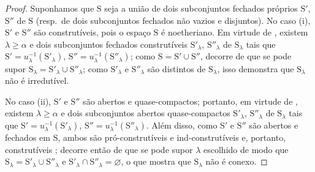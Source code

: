\begin{proof}
Suponhamos que $\mathrm{S}$ seja a união de dois subconjuntos fechados próprios $\mathrm{S}'$, $\mathrm{S}''$ de $\mathrm{S}$ (resp.\ de dois subconjuntos fechados não vazios e disjuntos).
No caso (i), $\mathrm{S}'$ e $\mathrm{S}''$ são construtíveis, pois o espaço $\mathrm{S}$ é noetheriano.
Em virtude de , existem $\lambda\geqslant\alpha$ e dois subconjuntos fechados construtíveis $\mathrm{S}'_\lambda$, $\mathrm{S}''_\lambda$ de $\mathrm{S}_\lambda$ tais que $\mathrm{S}'=u_\lambda^{-1}(\mathrm{S}'_\lambda)$, $\mathrm{S}''=u_\lambda^{-1}(\mathrm{S}''_\lambda)$; como $\mathrm{S}=\mathrm{S}'\cup\mathrm{S}''$, decorre de  que se pode supor $\mathrm{S}_\lambda=\mathrm{S}'_\lambda\cup\mathrm{S}''_\lambda$; como $\mathrm{S}'_\lambda$ e $\mathrm{S}''_\lambda$ são distintos de $\mathrm{S}_\lambda$, isso demonstra que $\mathrm{S}_\lambda$ não é irredutível.

No caso (ii), $\mathrm{S}'$ e $\mathrm{S}''$ são abertos e quase-compactos; portanto, em virtude de , existem $\lambda\geqslant\alpha$ e dois subconjuntos abertos quase-compactos $\mathrm{S}'_\lambda$, $\mathrm{S}''_\lambda$ de $\mathrm{S}_\lambda$ tais que $\mathrm{S}'=u_\lambda^{-1}(\mathrm{S}'_\lambda)$, $\mathrm{S}''=u_\lambda^{-1}(\mathrm{S}''_\lambda)$.
Além disso, como $\mathrm{S}'$ e $\mathrm{S}''$ são abertos e fechados em $\mathrm{S}$, ambos são pró-construtíveis e ind-construtíveis  e, portanto, construtíveis ; decorre então de  que se pode supor $\lambda$ escolhido de modo que $\mathrm{S}_\lambda=\mathrm{S}'_\lambda\cup\mathrm{S}''_\lambda$ e $\mathrm{S}'_\lambda\cap\mathrm{S}''_\lambda=\varnothing$, o que mostra que $\mathrm{S}_\lambda$ não é conexo.
\end{proof}

